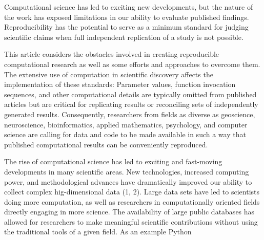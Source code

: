 Computational science has led to exciting new developments, but the nature of the work has exposed limitations in our ability to evaluate published findings. Reproducibility has the potential to serve as a minimum standard for judging scientific claims when full independent replication of a study is not possible. \cite{peng2011reproducible}

This article considers the obstacles involved in creating reproducible computational research as well as some efforts and approaches to overcome them.\cite{levequereproducible} The
extensive use of computation in scientific discovery
affects the implementation of these standards:
Parameter values, function invocation sequences,
and other computational details are typically
omitted from published articles but are critical
for replicating results or reconciling sets of
independently generated results. Consequently,
researchers from fields as diverse as geoscience,
neuroscience, bioinformatics, applied mathematics,
psychology, and computer science are calling
for data and code to be made available in such a
way that published computational results can be
conveniently reproduced.

The rise of computational science has led to exciting and fast-moving developments in many scientific areas. New technologies, increased computing power, and methodological advances have dramatically improved our ability to collect complex hig-dimensional data (1, 2). Large data sets have led to scientists doing more computation, as well as researchers in computationally oriented fields directly engaging in more science. The availability of large public databases has allowed for researchers to make meaningful scientific contributions without using the traditional tools of a given field. As an example Python \cite{peng2011reproducible}